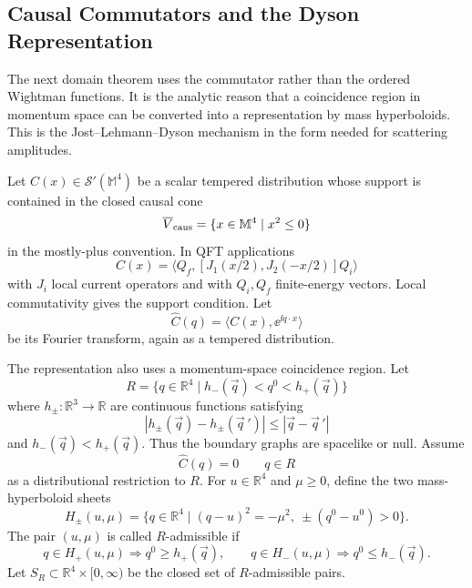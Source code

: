 \subsection{Causal Commutators and the Dyson Representation}
\label{subsec:causal-commutator-dyson-representation}

The next domain theorem uses the commutator rather than the ordered
Wightman functions.  It is the analytic reason that a coincidence region in
momentum space can be converted into a representation by mass hyperboloids.
This is the Jost--Lehmann--Dyson mechanism in the form needed for scattering
amplitudes.

Let \(C(x)\in\mathcal S'(\mathbb M^4)\) be a scalar tempered distribution
whose support is contained in the closed causal cone
\[
  \overline V_{\rm caus}
  =
  \{x\in\mathbb M^4\mid x^2\le0\}
\]
in the mostly-plus convention.  In QFT applications
\begin{equation}
  C(x)
  =
  \langle Q_f,
    [J_1(x/2),J_2(-x/2)]
  Q_i\rangle
  \label{eq:causal-commutator-matrix-coefficient}
\end{equation}
with \(J_i\) local current operators and with \(Q_i,Q_f\) finite-energy
vectors.  Local commutativity gives the support condition.  Let
\[
  \widehat C(q)=\langle C(x),\ee^{\ii q\cdot x}\rangle
\]
be its Fourier transform, again as a tempered distribution.

The representation also uses a momentum-space coincidence region.  Let
\begin{equation}
  R=\{q\in\mathbb R^4\mid h_-(\vec q)<q^0<h_+(\vec q)\}
  \label{eq:dyson-coincidence-slab}
\end{equation}
where \(h_\pm:\mathbb R^3\to\mathbb R\) are continuous functions satisfying
\[
  |h_\pm(\vec q)-h_\pm(\vec q\,')|
  \le |\vec q-\vec q\,'|
\]
and \(h_-(\vec q)<h_+(\vec q)\).  Thus the boundary graphs are spacelike or
null.  Assume
\begin{equation}
  \widehat C(q)=0
  \qquad q\in R
  \label{eq:causal-commutator-vanishing-region}
\end{equation}
as a distributional restriction to \(R\).  For \(u\in\mathbb R^4\) and
\(\mu\ge0\), define the two mass-hyperboloid sheets
\[
  H_\pm(u,\mu)
  =
  \{q\in\mathbb R^4\mid (q-u)^2=-\mu^2,\ \pm(q^0-u^0)>0\}.
\]
The pair \((u,\mu)\) is called \(R\)-admissible if
\begin{equation}
  q\in H_+(u,\mu)\Rightarrow q^0\ge h_+(\vec q),
  \qquad
  q\in H_-(u,\mu)\Rightarrow q^0\le h_-(\vec q).
  \label{eq:dyson-admissible-hyperboloid}
\end{equation}
Let \(S_R\subset\mathbb R^4\times[0,\infty)\) be the closed set of
\(R\)-admissible pairs.

